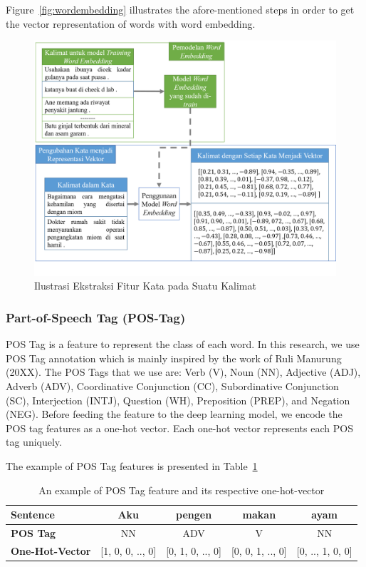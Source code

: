 Figure~\ref{fig:wordembedding} illustrates the afore-mentioned steps in order to get the vector representation of words with word embedding.

\begin{figure}
	\centering
	\includegraphics[width=\linewidth]{images/fiturkata}
	\caption{Ilustrasi Ekstraksi Fitur Kata pada Suatu Kalimat}
	\label{fig:fiturkata}
\end{figure}

\subsubsection{Part-of-Speech Tag (POS-Tag)}
POS Tag is a feature to represent the class of each word. In this research, we use POS Tag annotation which is mainly inspired by the work of Ruli Manurung (20XX). The POS Tags that we use are: Verb (V), Noun (NN), Adjective (ADJ), Adverb (ADV), Coordinative Conjunction (CC), Subordinative Conjunction (SC), Interjection (INTJ), Question (WH), Preposition (PREP), and Negation (NEG). Before feeding the feature to the deep learning model, we encode the POS tag features as a one-hot vector. Each one-hot vector represents each POS tag uniquely.

The example of POS Tag features is presented in Table~\ref{tab:examplepos}
\begin{table}
	\centering
	\caption{An example of POS Tag feature and its respective one-hot-vector}
	\label{tab:examplepos}
	\begin{tabular}{|lcccc|}
		\hline
		\textbf{Sentence} 				& Aku & pengen & makan & ayam \\
		\hline
		\textbf{POS Tag}				& NN & ADV & V & NN  \\
		\hline
		\textbf{One-Hot-Vector}		& [1, 0, 0, .., 0] & [0, 1, 0, .., 0] & [0, 0, 1, .., 0] & [0, .., 1, 0, 0] \\
		\hline
	\end{tabular}
\end{table}

